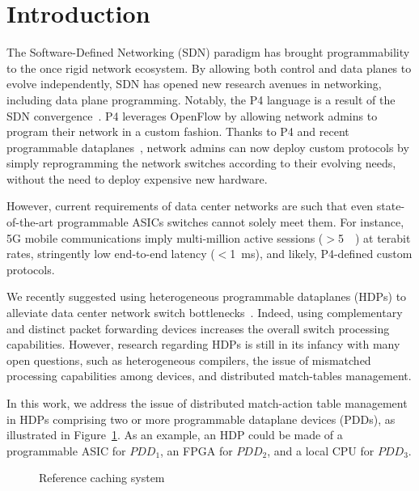 \section{Introduction}\label{sec:intro}

The Software-Defined Networking (SDN) paradigm has brought programmability to the once rigid network ecosystem.
By allowing both control and data planes to evolve independently, SDN has opened new research avenues in networking, including data plane programming.
Notably, the P4 language is a result of the SDN convergence~\cite{Bosshart:14}.
P4 leverages OpenFlow by allowing network admins to program their network in a custom fashion.
Thanks to P4 and recent programmable dataplanes~\cite{Bosshart:13}, network admins can now deploy custom protocols by simply reprogramming the network switches according to their evolving needs, without the need to deploy expensive new hardware. 


However, current requirements of data center networks are such that even state-of-the-art programmable ASICs switches cannot solely meet them.
For instance, 5G mobile communications imply multi-million active sessions ($>$\SI{5}{\mega\nothing}) at terabit rates, stringently low end-to-end latency ($<$\SI{1}{\milli\second}), and likely, P4-defined custom protocols.

We recently suggested using heterogeneous programmable dataplanes (HDPs) to alleviate data center network switch bottlenecks~\cite{p4eu:18}.
Indeed, using complementary and distinct packet forwarding devices increases the overall switch processing capabilities.
However, research regarding HDPs is still in its infancy with many open questions, such as heterogeneous compilers, the issue of mismatched processing capabilities among devices, and distributed match-tables management.

In this work, we address the issue of distributed match-action table management in HDPs comprising two or more programmable dataplane devices (PDDs), as illustrated in Figure~\ref{fig:high_level_network}.
As an example, an HDP could be made of a programmable ASIC for $PDD_1$, an  FPGA for $PDD_2$, and a local CPU for $PDD_3$.

\begin{figure}[]
	\centering
	
	\caption{Reference caching system}
	\label{fig:high_level_network}
\end{figure}

